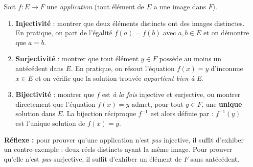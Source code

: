 \documentclass[11pt]{article}
\begin{document}
\begin{methode}
Soit $f:E\to F$ une \emph{application} (tout élément de $E$ a une image dans $F$).
\begin{enumerate}
\item \textbf{Injectivité} : montrer que deux éléments distincts ont des images distinctes. En pratique, on part de l'égalité $f(a)=f(b)$ avec $a,b\in E$ et on démontre que $a=b$.
\item \textbf{Surjectivité} : montrer que tout élément $y\in F$ possède au moins un antécédent dans $E$. En pratique, on résout l'équation $f(x)=y$ d'inconnue $x\in E$ et on vérifie que la solution trouvée \emph{appartient bien à} $E$.
\item \textbf{Bijectivité} : montrer que $f$ est \emph{à la fois} injective et surjective, ou montrer directement que l'équation $f(x)=y$ admet, pour tout $y\in F$, une \textbf{unique} solution dans $E$. La bijection réciproque $f^{-1}$ est alors définie par : $f^{-1}(y)$ est l'unique solution de $f(x)=y$.
\end{enumerate}
\textbf{Réflexe :} pour prouver qu'une application n'est \emph{pas} injective, il suffit d'exhiber un contre-exemple : deux réels distincts ayant la même image. Pour prouver qu'elle n'est \emph{pas} surjective, il suffit d'exhiber un élément de $F$ sans antécédent.
\end{methode}
\end{document}
